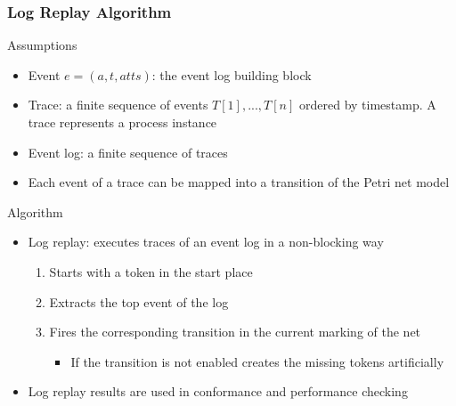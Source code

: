 \documentclass[10pt]{beamer}
\begin{document}
\begin{frame}
\frametitle{Log Replay Algorithm}
	\begin{block}{Assumptions}
		\begin{itemize}
		\item Event $e =(a,t,atts)$: the event log building block
		\item Trace: a finite sequence of events $T[1],..., T[n]$ ordered by timestamp. A trace represents a process instance
		\item Event log: a finite sequence of traces
		\item Each event of a trace can be mapped into a transition of the Petri net model
		\end{itemize}
	\end{block}
	\begin{block}{{Algorithm}}
		\begin{itemize}
			\item \alert{Log replay}: executes traces of an event log in a non-blocking way
					\begin{enumerate}
					\item Starts with a token in the start place
					\item Extracts the top event of the log
					\item Fires the corresponding transition in the current marking of the net
						\begin{itemize}
						\item If the transition is not enabled creates the missing tokens artificially
						\end{itemize}
				\end{enumerate}
		\item Log replay results are used in conformance and performance checking
		\end{itemize}
	\end{block}
\end{frame}
\end{document}
